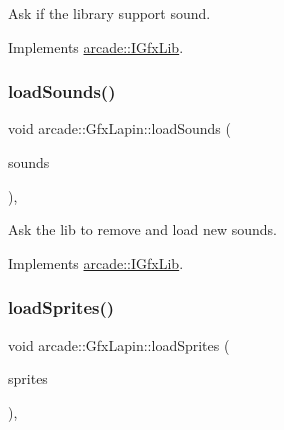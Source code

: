 Ask if the library support sound. 



Implements \hyperlink{classarcade_1_1_i_gfx_lib_a68cfbc987dfecca5b1405e36e00157b2}{arcade\+::\+I\+Gfx\+Lib}.

\mbox{\label{classarcade_1_1_gfx_lapin_a54039353c2da52bb45b233d4b8839551}} 
\subsubsection{\texorpdfstring{load\+Sounds()}{loadSounds()}}
{\footnotesize\ttfamily void arcade\+::\+Gfx\+Lapin\+::load\+Sounds (\begin{DoxyParamCaption}\item[{std\+::vector$<$ std\+::pair$<$ std\+::string, \hyperlink{namespacearcade_a3bb4743a2eea59f3927e404e6549cae5}{Sound\+Type} $>$ $>$ const \&}]{sounds }\end{DoxyParamCaption})\hspace{0.3cm}{\ttfamily [override]}, {\ttfamily [virtual]}}



Ask the lib to remove and load new sounds. 



Implements \hyperlink{classarcade_1_1_i_gfx_lib_a725faf0722d284d15eb389b0a1891a27}{arcade\+::\+I\+Gfx\+Lib}.

\mbox{\label{classarcade_1_1_gfx_lapin_a164a694063507041dbd78415898d5157}} 
\subsubsection{\texorpdfstring{load\+Sprites()}{loadSprites()}}
{\footnotesize\ttfamily void arcade\+::\+Gfx\+Lapin\+::load\+Sprites (\begin{DoxyParamCaption}\item[{std\+::vector$<$ std\+::unique\+\_\+ptr$<$ \hyperlink{classarcade_1_1_i_sprite}{I\+Sprite} $>$$>$ \&\&}]{sprites }\end{DoxyParamCaption})\hspace{0.3cm}{\ttfamily [override]}, {\ttfamily [virtual]}}



